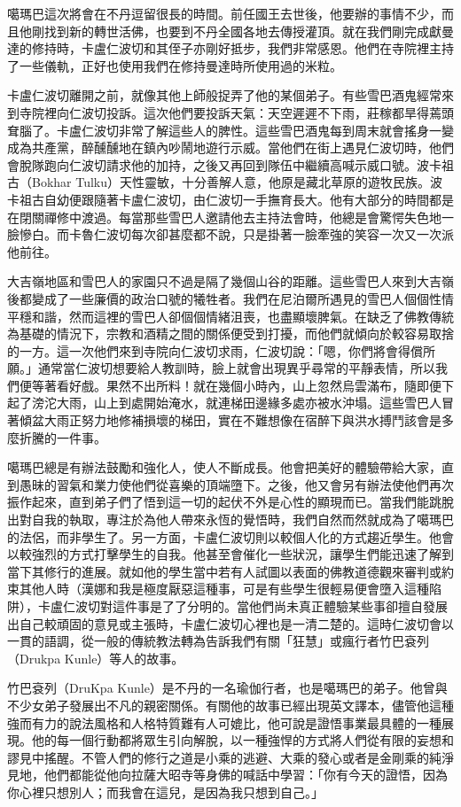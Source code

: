 噶瑪巴這次將會在不丹逗留很長的時間。前任國王去世後，他要辦的事情不少，而且他剛找到新的轉世活佛，也要到不丹全國各地去傳授灌頂。就在我們剛完成獻曼達的修持時，卡盧仁波切和其侄子亦剛好抵步，我們非常感恩。他們在寺院裡主持了一些儀軌，正好也使用我們在修持曼達時所使用過的米粒。

卡盧仁波切離開之前，就像其他上師般捉弄了他的某個弟子。有些雪巴酒鬼經常來到寺院裡向仁波切投訴。這次他們要投訴天氣：天空遲遲不下雨，莊稼都旱得蔫頭耷腦了。卡盧仁波切非常了解這些人的脾性。這些雪巴酒鬼每到周末就會搖身一變成為共產黨，醉醺醺地在鎮內吵鬧地遊行示威。當他們在街上遇見仁波切時，他們會脫隊跑向仁波切請求他的加持，之後又再回到隊伍中繼續高喊示威口號。波卡祖古（Bokhar
Tulku）天性靈敏，十分善解人意，他原是藏北草原的遊牧民族。波卡祖古自幼便跟隨著卡盧仁波切，由仁波切一手撫育長大。他有大部分的時間都是在閉關禪修中渡過。每當那些雪巴人邀請他去主持法會時，他總是會驚愕失色地一臉慘白。而卡魯仁波切每次卻甚麼都不說，只是掛著一臉牽強的笑容一次又一次派他前往。

大吉嶺地區和雪巴人的家園只不過是隔了幾個山谷的距離。這些雪巴人來到大吉嶺後都變成了一些廉價的政治口號的犧牲者。我們在尼泊爾所遇見的雪巴人個個性情平穩和諧，然而這裡的雪巴人卻個個情緒沮喪，也盡顯壞脾氣。在缺乏了佛教傳統為基礎的情況下，宗教和酒精之間的關係便受到打擾，而他們就傾向於較容易取捨的一方。這一次他們來到寺院向仁波切求雨，仁波切說：「嗯，你們將會得償所願。」通常當仁波切想要給人教訓時，臉上就會出現異乎尋常的平靜表情，所以我們便等著看好戲。果然不出所料！就在幾個小時內，山上忽然烏雲滿布，隨即便下起了滂沱大雨，山上到處開始淹水，就連梯田邊緣多處亦被水沖塌。這些雪巴人冒著傾盆大雨正努力地修補損壞的梯田，實在不難想像在宿醉下與洪水搏鬥該會是多麼折騰的一件事。

噶瑪巴總是有辦法鼓勵和強化人，使人不斷成長。他會把美好的體驗帶給大家，直到愚昧的習氣和業力使他們從喜樂的頂端墮下。之後，他又會另有辦法使他們再次振作起來，直到弟子們了悟到這一切的起伏不外是心性的顯現而已。當我們能跳脫出對自我的執取，專注於為他人帶來永恆的覺悟時，我們自然而然就成為了噶瑪巴的法侶，而非學生了。另一方面，卡盧仁波切則以較個人化的方式趨近學生。他會以較強烈的方式打擊學生的自我。他甚至會催化一些狀況，讓學生們能迅速了解到當下其修行的進展。就如他的學生當中若有人試圖以表面的佛教道德觀來審判或約束其他人時（漢娜和我是極度厭惡這種事，可是有些學生很輕易便會墮入這種陷阱），卡盧仁波切對這件事是了了分明的。當他們尚未真正體驗某些事卻擅自發展出自己較頑固的意見或主張時，卡盧仁波切心裡也是一清二楚的。這時仁波切會以一貫的語調，從一般的傳統教法轉為告訴我們有關「狂慧」或瘋行者竹巴袞列（Drukpa
Kunle）等人的故事。

竹巴袞列（DruKpa
Kunle）是不丹的一名瑜伽行者，也是噶瑪巴的弟子。他曾與不少女弟子發展出不凡的親密關係。有關他的故事已經出現英文譯本，儘管他這種強而有力的說法風格和人格特質難有人可媲比，他可說是證悟事業最具體的一種展現。他的每一個行動都將眾生引向解脫，以一種強悍的方式將人們從有限的妄想和謬見中搖醒。不管人們的修行之道是小乘的逃避、大乘的發心或者是金剛乘的純淨見地，他們都能從他向拉薩大昭寺等身佛的喊話中學習：「你有今天的證悟，因為你心裡只想別人；而我會在這兒，是因為我只想到自己。」

